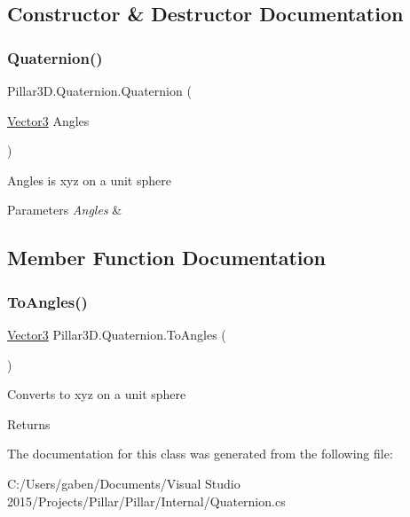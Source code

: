 \subsection{Constructor \& Destructor Documentation}
\mbox{\label{class_pillar3_d_1_1_quaternion_a82aed3ea7cf7302ebb89d33e45941413}} 
\subsubsection{\texorpdfstring{Quaternion()}{Quaternion()}}
{\footnotesize\ttfamily Pillar3\+D.\+Quaternion.\+Quaternion (\begin{DoxyParamCaption}\item[{\hyperlink{class_pillar3_d_1_1_vector3}{Vector3}}]{Angles }\end{DoxyParamCaption})}



Angles is xyz on a unit sphere 


\begin{DoxyParams}{Parameters}
{\em Angles} & \\
\hline
\end{DoxyParams}


\subsection{Member Function Documentation}
\mbox{\label{class_pillar3_d_1_1_quaternion_aba7fc95eb3ab95f2ca51d4a205c798db}} 
\subsubsection{\texorpdfstring{To\+Angles()}{ToAngles()}}
{\footnotesize\ttfamily \hyperlink{class_pillar3_d_1_1_vector3}{Vector3} Pillar3\+D.\+Quaternion.\+To\+Angles (\begin{DoxyParamCaption}{ }\end{DoxyParamCaption})}



Converts to xyz on a unit sphere 

\begin{DoxyReturn}{Returns}

\end{DoxyReturn}


The documentation for this class was generated from the following file\+:\begin{DoxyCompactItemize}
\item 
C\+:/\+Users/gaben/\+Documents/\+Visual Studio 2015/\+Projects/\+Pillar/\+Pillar/\+Internal/Quaternion.\+cs\end{DoxyCompactItemize}
